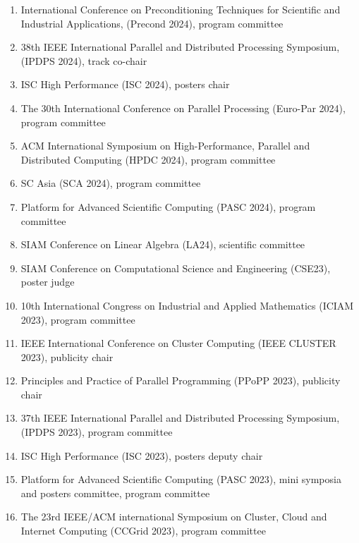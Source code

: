 \documentclass[margin,line]{cv}
\begin{document}
\begin{resume}
\begin{enumerate}
\item International Conference on Preconditioning Techniques for Scientific and Industrial Applications, (Precond 2024), program committee
\item 38th IEEE International Parallel and Distributed Processing Symposium, (IPDPS 2024), track co-chair

\item ISC High Performance (ISC 2024), posters chair

\item The 30th International Conference on Parallel Processing (Euro-Par 2024), program committee

\item ACM International Symposium on High-Performance, Parallel and Distributed Computing (HPDC 2024), program committee

\item SC Asia (SCA 2024), program committee

\item Platform for Advanced Scientific Computing (PASC 2024), program committee

\item SIAM Conference on Linear Algebra (LA24), scientific committee

\item SIAM Conference on Computational Science and Engineering (CSE23), poster judge

\item 10th International Congress on Industrial and Applied Mathematics (ICIAM 2023), program committee

\item IEEE International Conference on Cluster Computing (IEEE CLUSTER 2023), publicity chair

\item Principles and Practice of Parallel Programming (PPoPP 2023), publicity chair

\item 37th IEEE International Parallel and Distributed Processing Symposium, (IPDPS 2023), program committee

\item ISC High Performance (ISC 2023), posters deputy chair

\item Platform for Advanced Scientific Computing (PASC 2023), mini symposia and posters committee, program committee

\item The 23rd IEEE/ACM international Symposium on Cluster, Cloud and Internet Computing (CCGrid 2023), program committee


\end{enumerate}
\end{resume}
\end{document}

